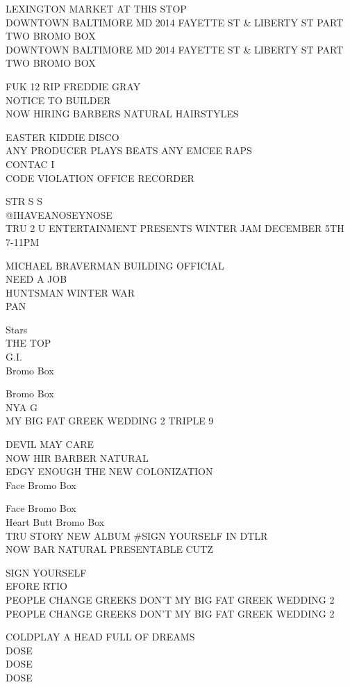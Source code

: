 \documentclass[10pt,letterpaper]{article}
\begin{document}
LEXINGTON MARKET AT THIS STOP\\
DOWNTOWN BALTIMORE MD 2014 FAYETTE ST \& LIBERTY ST PART TWO BROMO BOX\\
DOWNTOWN BALTIMORE MD 2014 FAYETTE ST \& LIBERTY ST PART TWO BROMO BOX

FUK 12 RIP FREDDIE GRAY\\
NOTICE TO BUILDER\\
NOW HIRING BARBERS NATURAL HAIRSTYLES

EASTER KIDDIE DISCO\\
ANY PRODUCER PLAYS BEATS ANY EMCEE RAPS\\
CONTAC I\\
CODE VIOLATION OFFICE RECORDER

STR S S\\
@IHAVEANOSEYNOSE\\
TRU 2 U ENTERTAINMENT PRESENTS WINTER JAM DECEMBER 5TH 7{-}11PM

MICHAEL BRAVERMAN BUILDING OFFICIAL\\
NEED A JOB\\
HUNTSMAN WINTER WAR\\
PAN

Stars\\
THE TOP\\
G.I.\\
Bromo Box

Bromo Box\\
NYA G\\
MY BIG FAT GREEK WEDDING 2 TRIPLE 9

DEVIL MAY CARE\\
NOW HIR BARBER NATURAL\\
EDGY ENOUGH THE NEW COLONIZATION\\
Face Bromo Box

Face Bromo Box\\
Heart Butt Bromo Box\\
TRU STORY NEW ALBUM \#SIGN YOURSELF IN DTLR\\
NOW BAR NATURAL PRESENTABLE CUTZ

SIGN YOURSELF\\
EFORE RTIO\\
PEOPLE CHANGE GREEKS DON'T MY BIG FAT GREEK WEDDING 2\\
PEOPLE CHANGE GREEKS DON'T MY BIG FAT GREEK WEDDING 2

COLDPLAY A HEAD FULL OF DREAMS\\
DOSE\\
DOSE\\
DOSE
\end{document}
